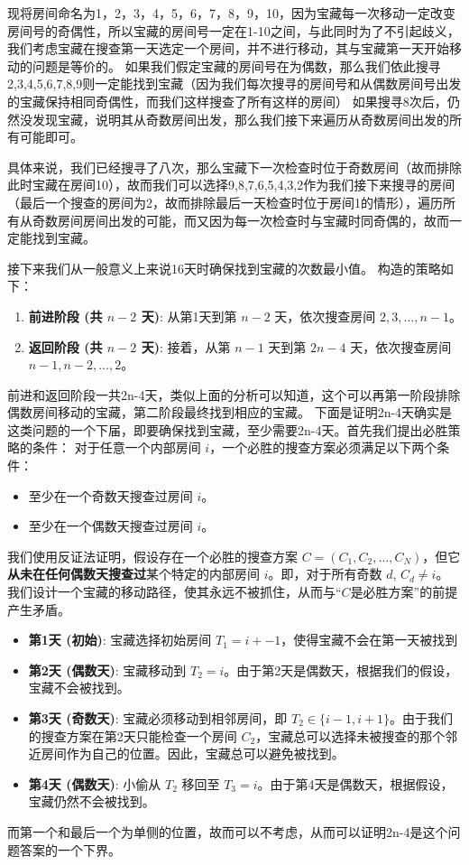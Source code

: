 \documentclass{article}
\begin{document}
现将房间命名为1，2，3，4，5，6，7，8，9，10，因为宝藏每一次移动一定改变房间号的奇偶性，所以宝藏的房间号一定在1-10之间，与此同时为了不引起歧义，我们考虑宝藏在搜查第一天选定一个房间，并不进行移动，其与宝藏第一天开始移动的问题是等价的。
如果我们假定宝藏的房间号在为偶数，那么我们依此搜寻2,3,4,5,6,7,8,9则一定能找到宝藏（因为我们每次搜寻的房间号和从偶数房间号出发的宝藏保持相同奇偶性，而我们这样搜查了所有这样的房间）
如果搜寻8次后，仍然没发现宝藏，说明其从奇数房间出发，那么我们接下来遍历从奇数房间出发的所有可能即可。

具体来说，我们已经搜寻了八次，那么宝藏下一次检查时位于奇数房间（故而排除此时宝藏在房间10），故而我们可以选择9,8,7,6,5,4,3,2作为我们接下来搜寻的房间（最后一个搜查的房间为2，故而排除最后一天检查时位于房间1的情形），遍历所有从奇数房间房间出发的可能，而又因为每一次检查时与宝藏时同奇偶的，故而一定能找到宝藏。

接下来我们从一般意义上来说16天时确保找到宝藏的次数最小值。
构造的策略如下：
\begin{enumerate}
    \item \textbf{前进阶段 (共 $n-2$ 天)}: 从第1天到第 $n-2$ 天，依次搜查房间 $2, 3, \dots, n-1$。
    \item \textbf{返回阶段 (共 $n-2$ 天)}: 接着，从第 $n-1$ 天到第 $2n-4$ 天，依次搜查房间 $n-1, n-2, \dots, 2$。
\end{enumerate}
前进和返回阶段一共2n-4天，类似上面的分析可以知道，这个可以再第一阶段排除偶数房间移动的宝藏，第二阶段最终找到相应的宝藏。
下面是证明2n-4天确实是这类问题的一个下届，即要确保找到宝藏，至少需要2n-4天。首先我们提出必胜策略的条件：
对于任意一个内部房间 \(i\)，一个必胜的搜查方案必须满足以下两个条件：
\begin{itemize}
    \item 至少在一个奇数天搜查过房间 \(i\)。
    \item 至少在一个偶数天搜查过房间 \(i\)。
\end{itemize}
我们使用反证法证明，假设存在一个必胜的搜查方案 $C = (C_1, C_2, \dots, C_N)$，但它\textbf{从未在任何偶数天搜查过}某个特定的内部房间 $i$。即，对于所有奇数 $d$, $C_d \neq i$。
我们设计一个宝藏的移动路径，使其永远不被抓住，从而与“$C$是必胜方案”的前提产生矛盾。
\begin{itemize}
    \item \textbf{第1天 (初始)}: 宝藏选择初始房间 $T_1 = i+-1$，使得宝藏不会在第一天被找到
    \item \textbf{第2天 (偶数天)}: 宝藏移动到 $T_2 = i$。由于第2天是偶数天，根据我们的假设，宝藏不会被找到。
    \item \textbf{第3天 (奇数天)}: 宝藏必须移动到相邻房间，即 $T_2 \in \{i-1, i+1\}$。由于我们的搜查方案在第2天只能检查一个房间 $C_2$，宝藏总可以选择未被搜查的那个邻近房间作为自己的位置。因此，宝藏总可以避免被找到。
    \item \textbf{第4天 (偶数天)}: 小偷从 $T_2$ 移回至 $T_3 = i$。由于第4天是偶数天，根据假设，宝藏仍然不会被找到。
\end{itemize}
而第一个和最后一个为单侧的位置，故而可以不考虑，从而可以证明2n-4是这个问题答案的一个下界。
\end{document}
